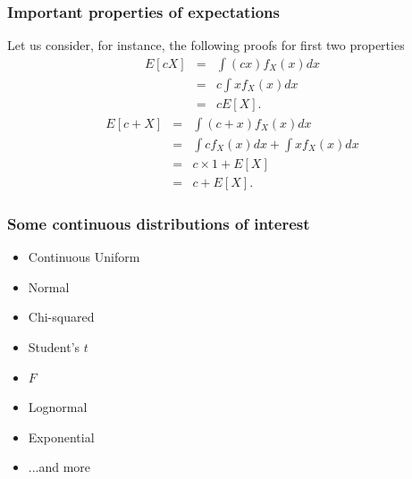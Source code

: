 \documentclass[notes=show,smaller,handout]{beamer}
\newenvironment{stepitemize}{\begin{itemize}[<+->]}{\end{itemize} }
\begin{document}
\begin{frame}%

\frametitle{Important properties of expectations}

Let us consider, for instance, the following proofs for first two properties%
\begin{eqnarray*}
E\left[ cX\right] &=&\int \left( cx\right) f_{X}\left( x\right) dx \\
&=&c\int xf_{X}\left( x\right) dx \\
&=&cE\left[ X\right].
\end{eqnarray*}%
\begin{eqnarray*}
E\left[ c+X\right] &=&\int \left( c+x\right) f_{X}\left( x\right) dx \\
&=&\int cf_{X}\left( x\right) dx+\int xf_{X}\left( x\right) dx \\
&=&c\times 1+E\left[ X\right] \\
&=&c+E\left[ X\right].
\end{eqnarray*}

\end{frame}%

\begin{frame}%

\frametitle{Some continuous distributions of interest}

\begin{stepitemize}
\item Continuous Uniform

\item Normal

\item Chi-squared

\item Student's $t$

\item $F$

\item Lognormal

\item Exponential

\item ...and more
\end{stepitemize}

\end{frame}%
\end{document}
